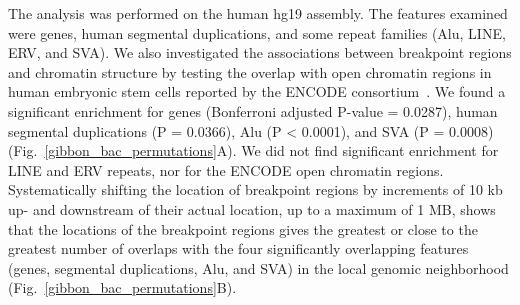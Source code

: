 The analysis was performed on the human hg19 assembly. The features examined were genes, human segmental duplications, and some repeat families (Alu, LINE, ERV, and SVA). We also investigated the associations between breakpoint regions and chromatin structure by testing the overlap with open chromatin regions in human embryonic stem cells reported by the ENCODE consortium~\cite{ENCODEProjectConsortium:2011iz}. We found a significant enrichment for genes (Bonferroni adjusted P-value = 0.0287), human segmental duplications (P = 0.0366), Alu (P < 0.0001), and SVA (P = 0.0008) (Fig.~\ref{gibbon_bac_permutations}A). We did not find significant enrichment for LINE and ERV repeats, nor for the ENCODE open chromatin regions. Systematically shifting the location of breakpoint regions by increments of 10 kb up- and downstream of their actual location, up to a maximum of 1 MB, shows that the locations of the breakpoint regions gives the greatest or close to the greatest number of overlaps with the four significantly overlapping features (genes, segmental duplications, Alu, and SVA) in the local genomic neighborhood (Fig.~\ref{gibbon_bac_permutations}B).

